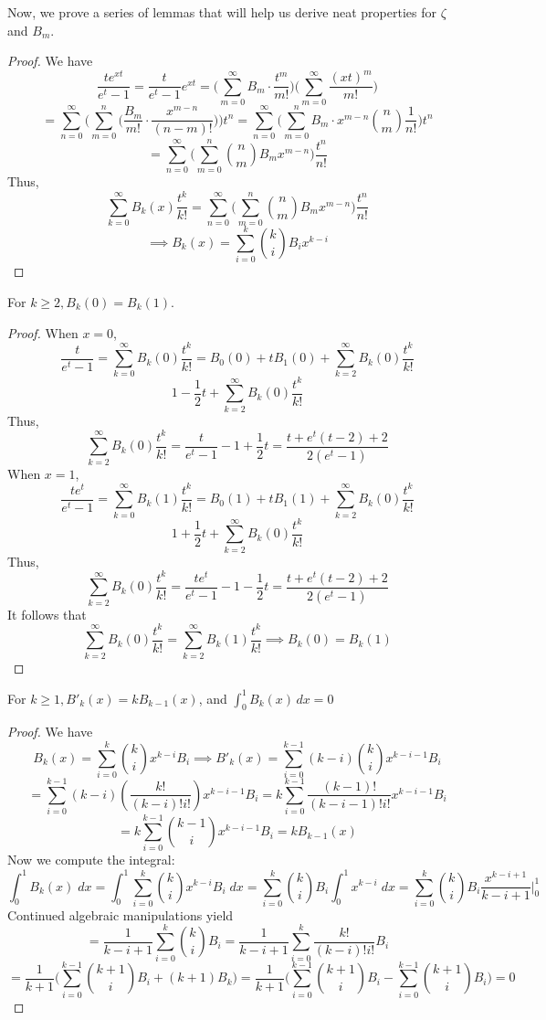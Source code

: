 Now, we prove a series of lemmas that will help us derive neat properties for $\zeta$ and $B_m$.
\begin{proof}
    We have
    \[
        \frac{te^{xt}}{e^t-1}=\frac{t}{e^t-1}e^{xt}=\big(\sum_{m=0}^{\infty}
        B_m\cdot\frac{t^m}{m!}\big)\big(\sum_{m=0}^{\infty}\frac{(xt)^m}{m!}\big)
    \]
    \[
        =\sum_{n=0}^{\infty}\big(\sum_{m=0}^n \big(\frac{B_m}{m!}\cdot
        \frac{x^{m-n}}{(n-m)!}\big)\big)t^n    
        =\sum_{n=0}^{\infty}\big(\sum_{m=0}^nB_m\cdot x^{m-n}{n\choose m}\frac{1}{n!}\big)t^n
        \]\[=\sum_{n=0}^{\infty}\big(\sum_{m=0}^n{n\choose m}B_mx^{m-n}\big)\frac{t^n}{n!}
    \]
    Thus, 
    \[
        \sum_{k=0}^{\infty}B_k(x)\frac{t^k}{k!} = 
        \sum_{n=0}^{\infty}\big(\sum_{m=0}^n{n\choose m}B_mx^{m-n}\big)\frac{t^n}{n!}
    \]
    \[
        \implies B_k(x)=\sum_{i=0}^{k}{k\choose i}B_ix^{k-i}
    \]  
\end{proof}
\begin{lemma}
    For $k \geq 2, B_k(0) = B_k(1)$.
\end{lemma}
\begin{proof}
    When $x=0$, 
    \[
        \frac{t}{e^t-1}=\sum_{k=0}^{\infty}B_k(0)\frac{t^k}{k!}=B_0(0)+tB_1(0)+\sum_{k=2}^{\infty}B_k(0)\frac{t^k}{k!}
    \]
    \[
        1-\frac{1}{2}t+\sum_{k=2}^{\infty}B_k(0)\frac{t^k}{k!}  
    \]
    Thus, 
    \[
        \sum_{k=2}^{\infty}B_k(0)\frac{t^k}{k!} = \frac{t}{e^t-1}-1+\frac{1}{2}t=\frac{t+e^t(t-2)+2}{2(e^t-1)}
    \]
    When $x=1$,
    \[
        \frac{te^{t}}{e^t-1}=\sum_{k=0}^{\infty}B_k(1)\frac{t^k}{k!}=B_0(1)+tB_1(1)+\sum_{k=2}^{\infty}B_k(0)\frac{t^k}{k!}
    \]
    \[
        1+\frac{1}{2}t+\sum_{k=2}^{\infty}B_k(0)\frac{t^k}{k!}  
    \]
    Thus, 
    \[
        \sum_{k=2}^{\infty}B_k(0)\frac{t^k}{k!} = \frac{te^t}{e^t-1}-1-\frac{1}{2}t=\frac{t+e^t(t-2)+2}{2(e^t-1)}
    \]
    It follows that 
    \[
        \sum_{k=2}^{\infty}B_k(0)\frac{t^k}{k!}=\sum_{k=2}^{\infty}B_k(1)\frac{t^k}{k!} \implies B_k(0)=B_k(1)
    \]
\end{proof}
\begin{lemma}
    For $k \geq 1, B'_k(x)=kB_{k-1}(x)$, and $\int_0^1B_k(x)\,dx =0$
\end{lemma}
\begin{proof}
    We have 
    \[
        B_k(x)=\sum_{i=0}^{k}{k\choose i}x^{k-i}B_i\implies B'_k(x)= 
        \sum_{i=0}^{k-1}(k-i){k\choose i}x^{k-i-1}B_i
    \]
    \[
        =\sum_{i=0}^{k-1}(k-i)(\frac{k!}{(k-i)!i!})x^{k-i-1}B_i=
        k\sum_{i=0}^{k-1}\frac{(k-1)!}{(k-i-1)!i!}x^{k-i-1}B_i
    \]
    \[
        =k\sum_{i=0}^{k-1}{{k-1}\choose i}x^{k-i-1}B_i=kB_{k-1}(x)
    \]
    Now we compute the integral:
    \[
        \int_0^1B_k(x)\;dx=\int_0^1\sum_{i=0}^{k}{k\choose i}x^{k-i}B_i\; dx  
        ={\sum_{i=0}^k{k\choose i}B_i}\int_0^1x^{k-i}\; dx
        =\sum_{i=0}^k{k\choose i}B_i\frac{x^{k-i+1}}{k-i+1}\bigg |_0^1
    \]
    Continued algebraic manipulations yield 
    \[=
        \frac{1}{k-i+1}\sum_{i=0}^k{k\choose i}B_i  
        =\frac{1}{k-i+1}\sum_{i=0}^k\frac{k!}{(k-i)!i!}B_i 
    \]       
    \[=
        \frac{1}{k+1}\big(\sum_{i=0}^{k-1}{{k+1}\choose i}B_i+(k+1)B_k\big)
        =  \frac{1}{k+1}\big(\sum_{i=0}^{k-1}{{k+1}\choose i}B_i-\sum_{i=0}^{k-1}{{k+1}
        \choose i}B_i\big)=0
    \]
\end{proof}
